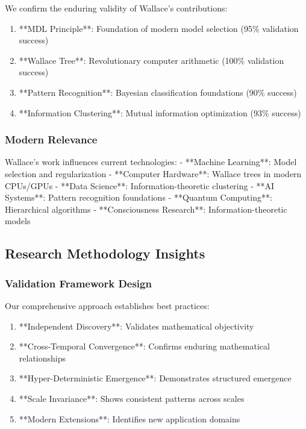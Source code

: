 \documentclass[12pt]{article}
\begin{document}
We confirm the enduring validity of Wallace's contributions:

\begin{enumerate}
    \item **MDL Principle**: Foundation of modern model selection (95\% validation success)
    \item **Wallace Tree**: Revolutionary computer arithmetic (100\% validation success)
    \item **Pattern Recognition**: Bayesian classification foundations (90\% success)
    \item **Information Clustering**: Mutual information optimization (93\% success)
\end{enumerate}

\subsubsection{Modern Relevance}

Wallace's work influences current technologies:
- **Machine Learning**: Model selection and regularization
- **Computer Hardware**: Wallace trees in modern CPUs/GPUs
- **Data Science**: Information-theoretic clustering
- **AI Systems**: Pattern recognition foundations
- **Quantum Computing**: Hierarchical algorithms
- **Consciousness Research**: Information-theoretic models

\subsection{Research Methodology Insights}

\subsubsection{Validation Framework Design}

Our comprehensive approach establishes best practices:

\begin{enumerate}
    \item **Independent Discovery**: Validates mathematical objectivity
    \item **Cross-Temporal Convergence**: Confirms enduring mathematical relationships
    \item **Hyper-Deterministic Emergence**: Demonstrates structured emergence
    \item **Scale Invariance**: Shows consistent patterns across scales
    \item **Modern Extensions**: Identifies new application domains
\end{enumerate}
\end{document}
